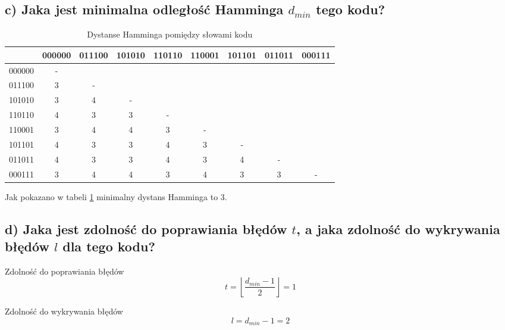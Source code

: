 \documentclass[12pt]{article}
\newcommand{\floor}[1]{\left\lfloor #1 \right\rfloor}
\begin{document}
    \subsection*{c) Jaka jest minimalna odległość Hamminga $d_{min}$ tego kodu?}

    \begin{table}[h]
        \centering
        \begin{tabular}{l|cccccccc}
            & 000000 & 011100 & 101010 & 110110 & 110001 & 101101 & 011011 & 000111 \\ \hline
            000000 & -      &        &        &        &        &        &        &        \\
            011100 & 3      & -      &        &        &        &        &        &        \\
            101010 & 3      & 4      & -      &        &        &        &        &        \\
            110110 & 4      & 3      & 3      & -      &        &        &        &        \\
            110001 & 3      & 4      & 4      & 3      & -      &        &        &        \\
            101101 & 4      & 3      & 3      & 4      & 3      & -      &        &        \\
            011011 & 4      & 3      & 3      & 4      & 3      & 4      & -      &        \\
            000111 & 3      & 4      & 4      & 3      & 4      & 3      & 3      & -     
        \end{tabular}
        \caption{Dystanse Hamminga pomiędzy słowami kodu}
        \label{tab:hammind-dist}
    \end{table}

    Jak pokazano w tabeli \ref{tab:hammind-dist} minimalny dystans Hamminga to 3. 

    \subsection*{d) Jaka jest zdolność do poprawiania błędów $t$, a jaka zdolność do wykrywania błędów $l$ dla tego kodu?}

    Zdolność do poprawiania błędów
    \begin{equation*}
        t= \floor{\frac{d_{min}-1}{2}} = 1
    \end{equation*}

    Zdolność do wykrywania błędów
    \begin{equation*}
        l = d_{min}-1 = 2
    \end{equation*}
\end{document}
